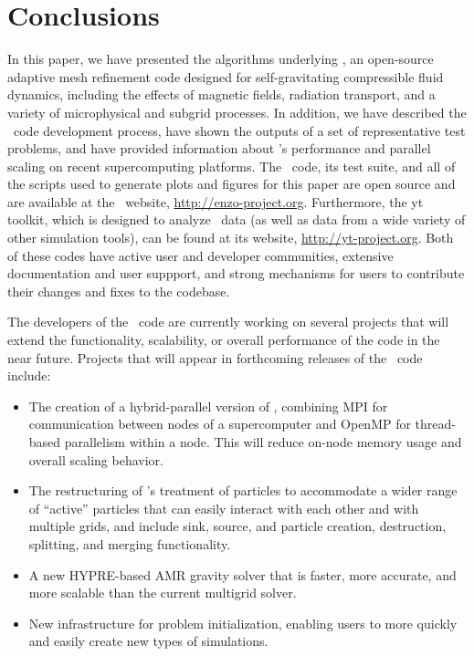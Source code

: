 
\section{Conclusions}
\label{sec.conclusions}

In this paper, we have presented the algorithms underlying \enzo, an
open-source adaptive mesh refinement code designed for
self-gravitating compressible fluid dynamics, including the effects of
magnetic fields, radiation transport, and a variety of microphysical
and subgrid processes.  In addition, we have described the \enzo\ code
development process, have shown the outputs of a set of representative
test problems, and have provided information about \enzo's performance
and parallel scaling on recent supercomputing platforms.  The \enzo\
code, its test suite, and all of the scripts used to generate plots
and figures for this paper are open source and are available at the
\enzo\ website, \url{http://enzo-project.org}.  Furthermore, the yt toolkit,
which is designed to analyze \enzo\ data (as well as data from a wide
variety of other simulation tools), can be found at its website,
\url{http://yt-project.org}.  Both of these codes have active user and
developer communities, extensive documentation and user suppport, and
strong mechanisms for users to contribute their changes and fixes to
the codebase.

The developers of the \enzo\ code are currently working on several
projects that will extend the functionality, scalability, or overall
performance of the code in the near future.  Projects that will appear
in forthcoming releases of the \enzo\ code include:

\begin{itemize}
\item The creation of a hybrid-parallel version of \enzo, combining
MPI for communication between nodes of a supercomputer and OpenMP for
thread-based parallelism within a node.  This will reduce on-node
memory usage and overall scaling behavior.
\item The restructuring of \enzo's treatment of particles to
accommodate a wider range of ``active'' particles that can easily
interact with each other and with multiple grids, and include sink,
source, and particle creation, destruction, splitting, and merging functionality.
\item A new HYPRE-based AMR gravity solver that is faster, more
accurate, and more scalable than the current multigrid solver.
\item New infrastructure for problem initialization, enabling
  users to more quickly and easily create new types of simulations.
\end{itemize}

